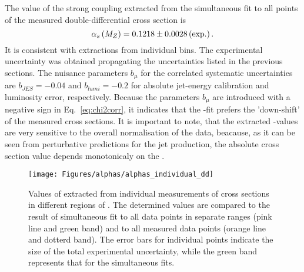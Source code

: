 The value of the strong coupling extracted from the simultaneous fit to all points of the measured double-differential cross section is
\begin{equation}
 \asz = 0.1218 \pm 0.0028 \left( \text{exp.} \right). %
 \label{eq:asdoubledifval}
\end{equation}
It is consistent with extractions from individual \qsq bins. The experimental uncertainty was obtained propagating the uncertainties listed in the previous sections. The nuisance parameters $b_{\mu}$ for the correlated systematic uncertainties are $b_{JES}=-0.04$ and $b_{lumi}=-0.2$ for absolute jet-energy calibration and luminosity error, respectively. Because the parameters $b_{\mu}$ are introduced with a negative sign in Eq.~\eqref{eq:chi2corr}, it indicates that the \as-fit prefers the 'down-shift' of the measured cross sections. It is important to note, that the extracted \as-values are very sensitive to the overall normalisation of the data, beacause, as it can be seen from perturbative predictions for the jet production, the absolute cross section value depends monotonicaly on the \asz.

\begin{figure}
 \centering
 \texttt{[image: Figures/alphas/alphas\_individual\_dd]}
 \caption{Values of \asz extracted from individual measurements of \dsdetjetb cross sections in different regions of \qsq. The determined values are compared to the result of simultaneous fit to all data points in separate \qsq ranges (pink line and green band) and to all measured data points (orange line and dotterd band). The error bars for individual points indicate the size of the total experimental uncertainty, while the green band represents that for the simultaneous fits.}
 \label{fig:asindividual_dd}
\end{figure}

% 
